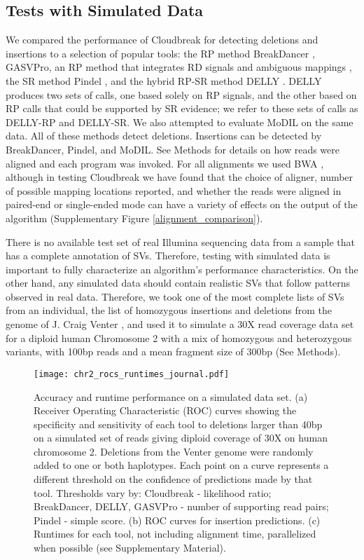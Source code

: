 \documentclass[11pt]{article}
\begin{document}
\subsection{Tests with Simulated Data}

We compared the performance of Cloudbreak for detecting deletions and insertions to a selection of popular tools: the RP method BreakDancer \autocite{Chen:2009p3}, GASVPro, an RP method that integrates RD signals and ambiguous mappings \autocite{Sindi:2012kk}, the SR method Pindel \autocite{Ye:2009p2}, and the hybrid RP-SR method DELLY \autocite{Rausch:2012he}. DELLY produces two sets of calls, one based solely on RP signals, and the other based on RP calls that could be supported by SR evidence; we refer to these sets of calls as DELLY-RP and DELLY-SR. We also attempted to evaluate MoDIL on the same data. All of these methods detect deletions. Insertions can be detected by BreakDancer, Pindel, and MoDIL. See Methods for details on how reads were aligned and each program was invoked. For all alignments we used BWA \autocite{Li:2009p836}, although in testing Cloudbreak we have found that the choice of aligner, number of possible mapping locations reported, and whether the reads were aligned in paired-end or single-ended mode can have a variety of effects on the output of the algorithm (Supplementary Figure \ref{alignment_comparison}).

There is no available test set of real Illumina sequencing data from a sample that has a complete annotation of SVs. Therefore, testing with simulated data is important to fully characterize an algorithm's performance characteristics. On the other hand, any simulated data should contain realistic SVs that follow patterns observed in real data. Therefore, we took one of the most complete lists of SVs from an individual, the list of homozygous insertions and deletions from the genome of J. Craig Venter \autocite{Levy:2007fb}, and used it to simulate a 30X read coverage data set for a diploid human Chromosome 2 with a mix of homozygous and heterozygous variants, with 100bp reads and a mean fragment size of 300bp (See Methods).

\begin{figure}
\centering
\texttt{[image: chr2\_rocs\_runtimes\_journal.pdf]}
\caption{Accuracy and runtime performance on a simulated data set. (a) Receiver Operating Characteristic (ROC) curves showing the specificity and sensitivity of each tool to deletions larger than 40bp on a simulated set of reads giving diploid coverage of 30X on human chromosome 2. Deletions from the Venter genome were randomly added to one or both haplotypes. Each point on a curve represents a different threshold on the confidence of predictions made by that tool. Thresholds vary by: Cloudbreak - likelihood ratio; BreakDancer, DELLY, GASVPro - number of supporting read pairs; Pindel - simple score. (b) ROC curves for insertion predictions. (c) Runtimes for each tool, not including alignment time, parallelized when possible (see Supplementary Material).}
\label{chr2CombinedRoc}
\end{figure}
\end{document}
